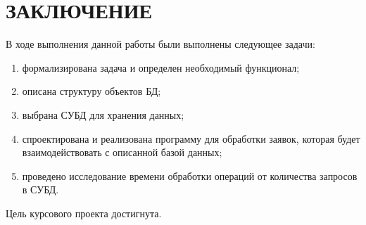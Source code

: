 
\section*{ЗАКЛЮЧЕНИЕ}


В ходе выполнения данной работы были выполнены следующее задачи:

\begin{enumerate}[label=\arabic*)]
	\item формализирована задача и определен необходимый функционал;
	\item описана структуру объектов БД;
	\item выбрана СУБД для хранения данных;
	\item спроектирована и реализована программу для обработки заявок, которая будет взаимодействовать с описанной базой данных; 
	\item проведено исследование времени обработки операций от количества запросов в СУБД.
\end{enumerate}


Цель курсового проекта достигнута.